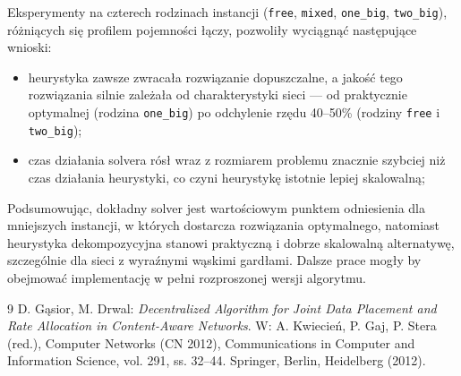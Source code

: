\documentclass{article}
\begin{document}
Eksperymenty na czterech rodzinach instancji (\texttt{free}, \texttt{mixed}, \texttt{one\_big}, \texttt{two\_big}), różniących się profilem pojemności łączy, pozwoliły wyciągnąć następujące wnioski:
\begin{itemize}
    \item heurystyka zawsze zwracała rozwiązanie dopuszczalne, a jakość tego rozwiązania silnie zależała od charakterystyki sieci — od praktycznie optymalnej (rodzina \texttt{one\_big}) po odchylenie rzędu 40--50\% (rodziny \texttt{free} i \texttt{two\_big});
    \item czas działania solvera rósł wraz z rozmiarem problemu znacznie szybciej niż czas działania heurystyki, co czyni heurystykę istotnie lepiej skalowalną;
\end{itemize}

Podsumowując, dokładny solver jest wartościowym punktem odniesienia dla mniejszych instancji, w których dostarcza rozwiązania optymalnego, natomiast heurystyka dekompozycyjna stanowi praktyczną i dobrze skalowalną alternatywę, szczególnie dla sieci z wyraźnymi wąskimi gardłami. Dalsze prace mogły by obejmować implementację w pełni rozproszonej wersji algorytmu.


\begin{thebibliography}{9}
D. Gąsior, M. Drwal:
\emph{Decentralized Algorithm for Joint Data Placement and Rate Allocation in Content-Aware Networks}.
W: A. Kwiecień, P. Gaj, P. Stera (red.), Computer Networks (CN 2012), Communications in Computer and Information Science, vol. 291, ss. 32--44. Springer, Berlin, Heidelberg (2012).
\end{thebibliography}
\end{document}
